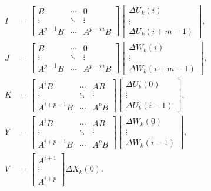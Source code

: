 \begin{align*}
I &= 
\begin{bmatrix}
B & \cdots & 0 \\
\vdots & \ddots & \vdots \\
A^{p-1} B & \cdots & A^{p-m} B
\end{bmatrix}
\begin{bmatrix}
\Delta U_k(i) \\
\vdots \\
\Delta U_k(i+m-1)
\end{bmatrix}, \\
J &= 
\begin{bmatrix}
B & \cdots & 0 \\
\vdots & \ddots & \vdots \\
A^{p-1} B & \cdots & A^{p-m} B
\end{bmatrix}
\begin{bmatrix}
\Delta W_k(i) \\
\vdots \\
\Delta W_k(i+m-1)
\end{bmatrix}, \\
K &= 
\begin{bmatrix}
A^i B & \cdots & A B \\
\vdots & \ddots & \vdots \\
A^{i+p-1} B & \cdots & A^p B
\end{bmatrix}
\begin{bmatrix}
\Delta U_k(0) \\
\vdots \\
\Delta U_k(i-1)
\end{bmatrix}, \\
Y &= 
\begin{bmatrix}
A^i B & \cdots & A B \\
\vdots & \ddots & \vdots \\
A^{i+p-1} B & \cdots & A^p B
\end{bmatrix}
\begin{bmatrix}
\Delta W_k(0) \\
\vdots \\
\Delta W_k(i-1)
\end{bmatrix}, \\
V &= 
\begin{bmatrix}
A^{i+1} \\
\vdots \\
A^{i+p}
\end{bmatrix}
\Delta X_k(0).
\end{align*}

